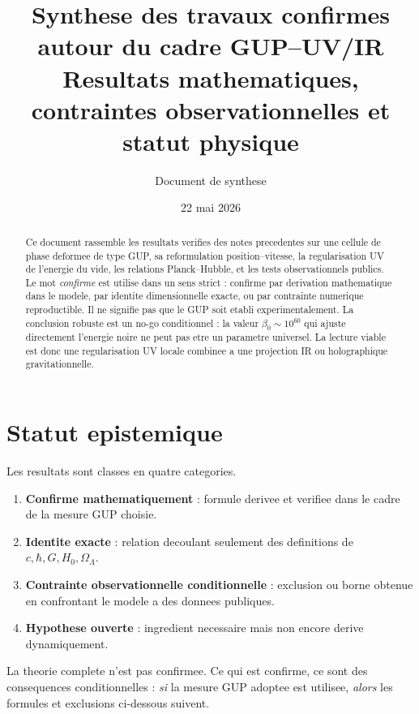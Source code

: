 \documentclass[11pt,a4paper]{article}
\title{Synthese des travaux confirmes autour du cadre GUP--UV/IR\\
\large Resultats mathematiques, contraintes observationnelles et statut physique}
\author{Document de synthese}
\date{22 mai 2026}
\begin{document}
\maketitle

\begin{abstract}
Ce document rassemble les resultats verifies des notes precedentes sur une
cellule de phase deformee de type GUP, sa reformulation position--vitesse, la
regularisation UV de l'energie du vide, les relations Planck--Hubble, et les
tests observationnels publics. Le mot \emph{confirme} est utilise dans un sens
strict : confirme par derivation mathematique dans le modele, par identite
dimensionnelle exacte, ou par contrainte numerique reproductible. Il ne signifie
pas que le GUP soit etabli experimentalement. La conclusion robuste est un
no-go conditionnel : la valeur $\beta_0\sim10^{60}$ qui ajuste directement
l'energie noire ne peut pas etre un parametre universel. La lecture viable est
donc une regularisation UV locale combinee a une projection IR ou
holographique gravitationnelle.
\end{abstract}

\tableofcontents
\newpage

\section{Statut epistemique}

Les resultats sont classes en quatre categories.

\begin{enumerate}
  \item \textbf{Confirme mathematiquement} : formule derivee et verifiee dans
  le cadre de la mesure GUP choisie.
  \item \textbf{Identite exacte} : relation decoulant seulement des definitions
  de $c,\hbar,G,H_0,\Omega_\Lambda$.
  \item \textbf{Contrainte observationnelle conditionnelle} : exclusion ou
  borne obtenue en confrontant le modele a des donnees publiques.
  \item \textbf{Hypothese ouverte} : ingredient necessaire mais non encore
  derive dynamiquement.
\end{enumerate}

\begin{tcolorbox}[colback=yellow!5!white,colframe=yellow!45!black,title=Point cle]
La theorie complete n'est pas confirmee. Ce qui est confirme, ce sont des
consequences conditionnelles : \emph{si} la mesure GUP adoptee est utilisee,
\emph{alors} les formules et exclusions ci-dessous suivent.
\end{tcolorbox}
\end{document}
